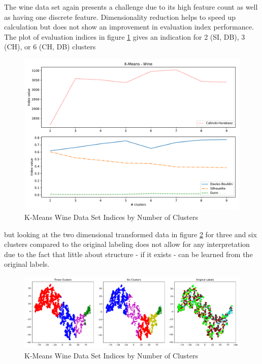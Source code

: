 The wine data set again presents a challenge due to its high feature count as well as having one discrete feature. Dimensionality reduction helps to speed up calculation but does not show an improvement in evaluation index performance. The plot of evaluation indices in figure \ref{fig:kmeans_wine_indices_comparison} gives an indication for 2 (\gls{SI}, \gls{DB}), 3 (\gls{CH}), or 6 (\gls{CH}, \gls{DB}) clusters

\begin{figure}[H]
\begin{center}
\includegraphics[width=1.0\textwidth]{images/kmeans_wine_index_plot.pdf}
\caption{K-Means Wine Data Set Indices by Number of Clusters}
\end{center}
\label{fig:kmeans_wine_indices_comparison}
\end{figure}

but looking at the two dimensional transformed data in figure \ref{fig:kmeans_wine_tsne} for three and six clusters compared to the original labeling does not allow for any interpretation due to the fact that little about structure - if it exists - can be learned from the original labels.




\begin{figure}[H]
\begin{center}
\includegraphics[width=1.0\textwidth]{images/kmeans_wine_tsne.pdf}
\caption{K-Means Wine Data Set Indices by Number of Clusters}
\end{center}
\label{fig:kmeans_wine_tsne}
\end{figure}

